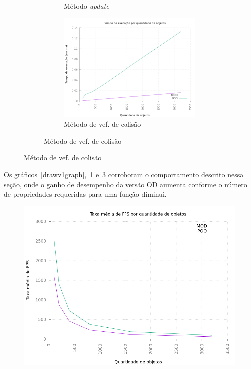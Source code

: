\begin{figure}[h!]
\begin{subfigure}[b]{\textwidth}
\begin{subfigure}[b]{.5\textwidth}
            \caption{Método \textit{update}}
            \label{updatev1graph}
        \end{subfigure}
        \begin{subfigure}[b]{.5\textwidth}
            \includegraphics[width=\textwidth]{../figuras/colisionv1graph}
            \caption{Método de vef. de colisão}
            \label{colisionv1graph}
        \end{subfigure}
    \end{subfigure}
    \par\medskip
    \label{v1graphs}
\end{figure}

Os gráficos~\ref{drawv1graph},~\ref{updatev1graph} 
e~\ref{colisionv1graph} corroboram o comportamento descrito nessa 
seção, onde o ganho de desempenho da versão OD aumenta conforme 
o número de propriedades requeridas para uma função diminui.

\begin{figure}[h!]
    \centering
    \includegraphics[width =\textwidth]{../figuras/fpsv1}
    \par\medskip
    \label{fpsv1graph}
\end{figure}

